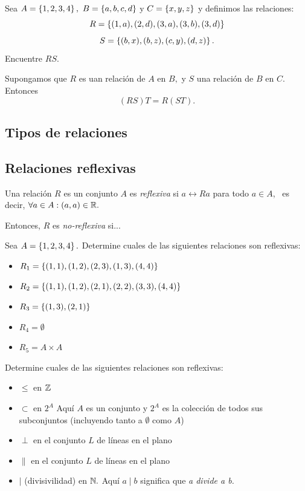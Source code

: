 	\begin{exmp}
		Sea $A=\left\{ 1,2,3,4 \right\},$ $B=\left\{ a,b,c,d \right\}$ y $C=\left\{ x,y,z \right\}$ y definimos las relaciones: 
		$$R=\left\{ (1,a),(2,d),(3,a),(3,b),(3,d) \right\}$$  $$S=\left\{ (b,x),(b,z),(c,y),(d,z) \right\}.$$ Encuentre $RS.$
	\end{exmp}
	



	\begin{thm}
		Supongamos que $R$ es uan relaci\'on de $A$ en $B,$ y $S$ una relaci\'on de $B$ en $C.$ Entonces
		$$
		(RS)T=R(ST).
		$$
	\end{thm}
	


\subsection{Tipos de relaciones}

\subsection{Relaciones reflexivas}


	
	Una relaci\'on $R$ es un conjunto $A$ es \emph{reflexiva} si $a\rel{R}a$ para todo $a\in A$, \, es decir, $\forall a \in A: (a,a)\in \mathbb{R}.$ 
	
	Entonces, $R$ es \emph{no-reflexiva} si...



	\begin{exmp}
		\label{lip:exmp:2.5}
		Sea $A=\left\{ 1,2,3,4 \right\}.$ Determine cuales de las siguientes relaciones son reflexivas:
		\begin{itemize}
			\item $R_{1}=\left\{ (1,1),(1,2),(2,3),(1,3),(4,4) \right\}$ 
			\item $R_{2}=\left\{ (1,1),(1,2),(2,1),(2,2),(3,3),(4,4) \right\}$ 
			\item $R_{3}=\left\{ (1,3),(2,1) \right\}$
			\item $R_{4}=\emptyset$
			\item $R_{5}=A \times A$
		\end{itemize}
		
	\end{exmp}
	



	\begin{exmp}
		\label{lip:exmp:2.6}
		Determine cuales de las siguientes relaciones son reflexivas:
		\begin{itemize}
			\item $\leq$ en $\mathbb{Z}$ 
			\item $\subset$ en $2^{A}$ 
			Aquí $A$ es un conjunto y $2^{A}$ es la colección de todos sus subconjuntos (incluyendo tanto a $\emptyset$ como $A$) 
			\item $\perp$ en el conjunto $L$ de l\'ineas en el plano 
			\item $\parallel$ en el conjunto $L$ de l\'ineas en el plano 
			\item $\mid$ (divisivilidad) en $\mathbb{N}.$  Aqu\'i $a\mid b$ significa que \emph{a divide a b.} 
		\end{itemize} 
	\end{exmp}


